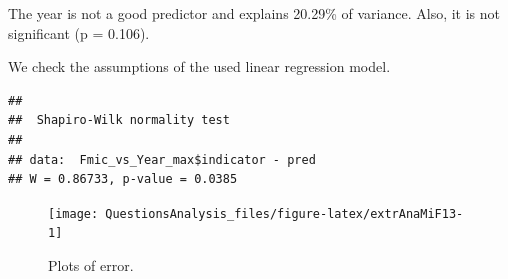 \documentclass[
]{article}
\newenvironment{Shaded}{\begin{snugshade}}{\end{snugshade}}
\newcommand{\AttributeTok}[1]{\textcolor[rgb]{0.77,0.63,0.00}{#1}}
\newcommand{\ConstantTok}[1]{\textcolor[rgb]{0.00,0.00,0.00}{#1}}
\newcommand{\DecValTok}[1]{\textcolor[rgb]{0.00,0.00,0.81}{#1}}
\newcommand{\FunctionTok}[1]{\textcolor[rgb]{0.00,0.00,0.00}{#1}}
\newcommand{\NormalTok}[1]{#1}
\newcommand{\OtherTok}[1]{\textcolor[rgb]{0.56,0.35,0.01}{#1}}
\newcommand{\SpecialCharTok}[1]{\textcolor[rgb]{0.00,0.00,0.00}{#1}}
\newcommand{\StringTok}[1]{\textcolor[rgb]{0.31,0.60,0.02}{#1}}
\begin{document}
The year is not a good predictor and explains 20.29\% of variance. Also, it is not significant (p = 0.106).

We check the assumptions of the used linear regression model.

\begin{Shaded}
\end{Shaded}

\begin{verbatim}
## 
##  Shapiro-Wilk normality test
## 
## data:  Fmic_vs_Year_max$indicator - pred
## W = 0.86733, p-value = 0.0385
\end{verbatim}

\begin{Shaded}
\end{Shaded}

\begin{figure}

{\centering \texttt{[image: QuestionsAnalysis\_files/figure-latex/extrAnaMiF13-1]} 

}

\caption{Plots of error.}\label{fig:extrAnaMiF13-1}
\end{figure}

\begin{Shaded}
\end{Shaded}
\end{document}
